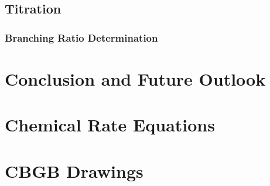 \documentclass [PhD,nolistoftables,scheader] {uclathes}
\begin{document}
%	

	\section{ Titration}
	
	
		\subsection{Branching Ratio Determination}
		
	
%		

\chapter{Conclusion and Future Outlook}
	

\appendix

\chapter{Chemical Rate Equations}


\chapter{CBGB Drawings}





\end{document}
